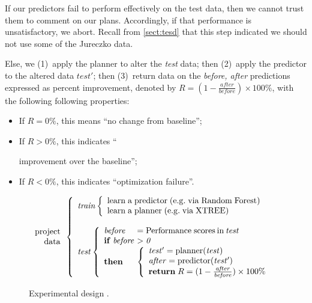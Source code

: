\documentclass{sig-alternate}
\newcommand{\bi}{\begin{itemize}}
\newcommand{\ei}{\end{itemize}}
\newcommand{\tion}[1]{\textsection\ref{sect:#1}}
\begin{document}
{\begin{itemize}[leftmargin=3mm]
If our { predictors} fail to perform effectively on the test data,
then we cannot trust them to comment on our plans. Accordingly,
if that performance is unsatisfactory, we abort. Recall from \tion{tesd} that this step indicated
we should not use some of the  Jureczko data.

Else, we (1)~apply the { planner} to alter the {\em test} data;
then (2)~apply the { predictor} to the altered data $test'$;
then (3)~return data on the {\em before, after} predictions expressed as percent improvement, denoted by  $R=(1-\frac{\mathit{after}}{\mathit{before}})\times100\%$, with the following following properties:
\bi
\item If $R  = 0\%$, this means  ``no change from baseline''; 
\item If $R \gt 0\%$, this indicates ``

improvement over the baseline'';
\item If $R \lt 0\%$, this indicates ``optimization failure''.
\ei

\begin{figure}[!t]
{\small 
\[
\begin{array}{r} 
\mathrm{project}\\
\mathrm{data}
\end{array} 
\left\{\begin{array}{l}\mathit{train}
        \left\{\begin{array}{l}
                \mathrm{learn\;a\;}\mathrm{predictor\;}\mathrm{(e.g.\;via \;Random\;Forest)}\\
                \mathrm{learn\;a\;}\mathrm{planner\;}\mathrm{(e.g.\;via \; XTREE)}
              \end{array}\right.
       \\
      ~\\
\mathit{test}  
    \left\{\begin{array}{l@{~}l}
           \mathit{before}& =\mathrm{Performance\; scores \hspace{2pt} in \hspace{2pt}}\mathit{test}\\
           \mathrm{\bf if\;}\mathit{before} & >  \mathit{0}\\
           \mathrm{\bf then} &
           \left\{
            \begin{array}{l}
                \mathit{test'} = \mathrm{planner}(\mathit{test})\\
                \mathit{after} =\mathrm{predictor}(\mathit{test'})\\ 
                \mathrm{{\bf return}\;} R=(1-\frac{\mathit{after}}{\mathit{before}})\times 100 \%
            \end{array}
          \right.
   \end{array}\right.
\end{array} \right. 
\]}
 \caption{Experimental design .}\label{fig:design}
 \end{figure}




\end{itemize}}
\end{document}
